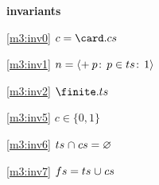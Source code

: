 \textbf{invariants}
\begin{block}
\item[ \eqref{m3:inv0} ]{$c = \card.cs $} %
\item[ \eqref{m3:inv1} ]{$n = { \langle + \:p\!:\, p \in ts\!:\, 1 \rangle } $} %
\item[ \eqref{m3:inv2} ]{$\finite.ts $} %
\item[ \eqref{m3:inv5} ]{$c \in \{0,1\} $} %
\item[ \eqref{m3:inv6} ]{$ts \mathbin{\mkern1mu\cap\mkern1mu} cs = \mathord\varnothing $} %
\item[ \eqref{m3:inv7} ]{$fs = ts \mathbin{\mkern1mu\cup\mkern1mu} cs $} %
\end{block}
